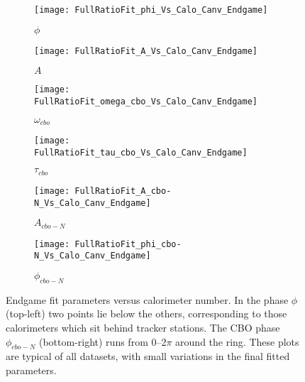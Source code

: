 \begin{figure}
\centering
    \begin{subfigure}[]{0.45\textwidth}
        \centering
        \texttt{[image: FullRatioFit\_phi\_Vs\_Calo\_Canv\_Endgame]}
        \caption{$\phi$}
    \end{subfigure}%
    \begin{subfigure}[]{0.45\textwidth}
        \centering
        \texttt{[image: FullRatioFit\_A\_Vs\_Calo\_Canv\_Endgame]}
        \caption{$A$}
    \end{subfigure}

    \begin{subfigure}[]{0.45\textwidth}
        \centering
        \texttt{[image: FullRatioFit\_omega\_cbo\_Vs\_Calo\_Canv\_Endgame]}
        \caption{$\omega_{cbo}$}
    \end{subfigure}%
    \begin{subfigure}[]{0.45\textwidth}
        \centering
        \texttt{[image: FullRatioFit\_tau\_cbo\_Vs\_Calo\_Canv\_Endgame]}
        \caption{$\tau_{cbo}$}
    \end{subfigure}

    \begin{subfigure}[]{0.45\textwidth}
        \centering
        \texttt{[image: FullRatioFit\_A\_cbo-N\_Vs\_Calo\_Canv\_Endgame]}
        \caption{$A_{cbo-N}$}
    \end{subfigure}%
    \begin{subfigure}[]{0.45\textwidth}
        \centering
        \texttt{[image: FullRatioFit\_phi\_cbo-N\_Vs\_Calo\_Canv\_Endgame]}
        \caption{$\phi_{cbo-N}$}
    \end{subfigure}
\caption[Endgame fit parameters versus calorimeter number]{Endgame fit parameters versus calorimeter number. In the  \gmtwo phase $\phi$ (top-left) two points lie below the others, corresponding to those calorimeters which sit behind tracker stations. The CBO phase $\phi_{cbo-N}$ (bottom-right) runs from 0--2$\pi$ around the ring. These plots are typical of all datasets, with small variations in the final fitted parameters.}
\label{fig:caloFits_EndgamePars_1}
\end{figure}

